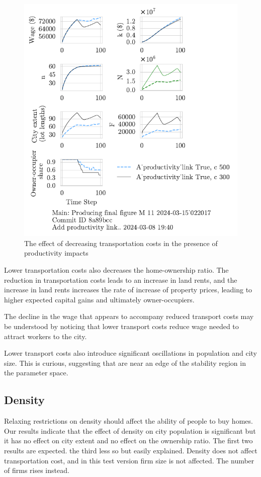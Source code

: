 \begin{figure}[h!t]
    \centering
    \includegraphics[scale=1, trim={0 1.4cm 0 0},clip]{fig/With-productivity_link-c-15_022017.pdf}
    \caption{The effect of decreasing transportation costs in the presence of productivity impacts}
    \label{fig:Productivity_link_and_c_ownership_trajectory}
\end{figure}

Lower transportation costs also decreases the home-ownership ratio. The reduction in transportation costs leads to an increase in land rents, and the increase in land rents increases the rate of increase of property prices, leading to higher expected capital gains and ultimately owner-occupiers. 

The decline in the wage that appears to accompany reduced transport costs may be understood by noticing that lower transport costs reduce  wage needed to attract workers to the city. 

Lower transport costs also introduce significant oscillations in population and city size. This is curious, suggesting that are  near an edge of the stability region in the parameter space.


\newpage
\subsection{Density}
Relaxing restrictions on density should affect the ability of people to buy homes. Our results indicate that the effect of density on city population is significant but it has no effect on city extent and no effect on the ownership ratio. The first two results are expected. the third less so but easily explained. Density does not affect transportation cost, and in this test version firm size is not affected. The number of firms rises instead. 

